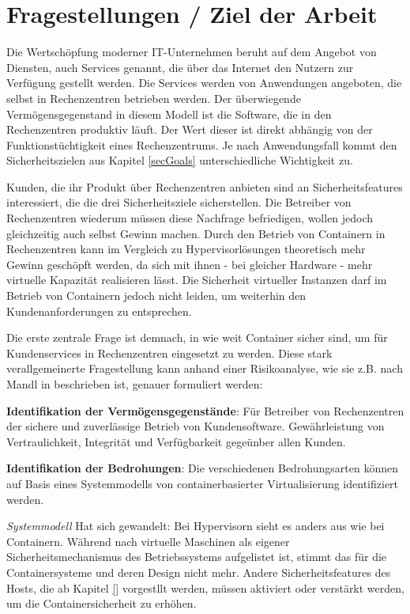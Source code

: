 \documentclass[../main.tex]{subfiles}
\begin{document}
\chapter{Fragestellungen / Ziel der Arbeit}
\label{question}
  Die Wertschöpfung moderner IT-Unternehmen beruht auf dem Angebot von Diensten, auch Services genannt, die über das Internet den Nutzern zur Verfügung gestellt werden. Die Services werden von Anwendungen angeboten, die selbst in Rechenzentren betrieben werden. Der überwiegende Vermögensgegenstand in diesem Modell ist die Software, die in den Rechenzentren produktiv läuft. Der Wert dieser ist direkt abhängig von der Funktionstüchtigkeit eines Rechenzentrums. Je nach Anwendungsfall kommt den Sicherheitszielen aus Kapitel \ref{secGoals} unterschiedliche Wichtigkeit zu.

  Kunden, die ihr Produkt über Rechenzentren anbieten sind an Sicherheitsfeatures interessiert, die die drei Sicherheitsziele sicherstellen. Die Betreiber von Rechenzentren wiederum müssen diese Nachfrage befriedigen, wollen jedoch gleichzeitig auch selbst Gewinn machen. Durch den Betrieb von Containern in Rechenzentren kann im Vergleich zu Hypervisorlösungen theoretisch mehr Gewinn geschöpft werden, da sich mit ihnen - bei gleicher Hardware - mehr virtuelle Kapazität realisieren lässt. Die Sicherheit virtueller Instanzen darf im Betrieb von Containern jedoch nicht leiden, um weiterhin den Kundenanforderungen zu entsprechen.

  Die erste zentrale Frage ist demnach, in wie weit Container sicher sind, um für Kundenservices in Rechenzentren eingesetzt zu werden. Diese stark verallgemeinerte Fragestellung kann anhand einer Risikoanalyse, wie sie z.B. nach Mandl in \cite[S.36]{CISSP} beschrieben ist, genauer formuliert werden:

  \textbf{Identifikation der Vermögensgegenstände}: Für Betreiber von Rechenzentren der sichere und zuverlässige Betrieb von Kundensoftware. Gewährleistung von Vertraulichkeit, Integrität und Verfügbarkeit gegeünber allen Kunden.

  \textbf{Identifikation der Bedrohungen}: Die verschiedenen Bedrohungsarten können auf Basis eines Systemmodells von containerbasierter Virtualisierung identifiziert werden.

  \emph{Systemmodell}
    Hat sich gewandelt: Bei Hypervisorn sieht es anders aus wie bei Containern. Während nach \cite[S.125]{CISSP} virtuelle Maschinen als eigener Sicherheitsmechanismus des Betriebssystems aufgelistet ist, stimmt das für die Containersysteme und deren Design nicht mehr. Andere Sicherheitsfeatures des Hosts, die ab Kapitel \ref{} vorgestllt werden, müssen aktiviert oder verstärkt werden, um die Containersicherheit zu erhöhen.
\end{document}
